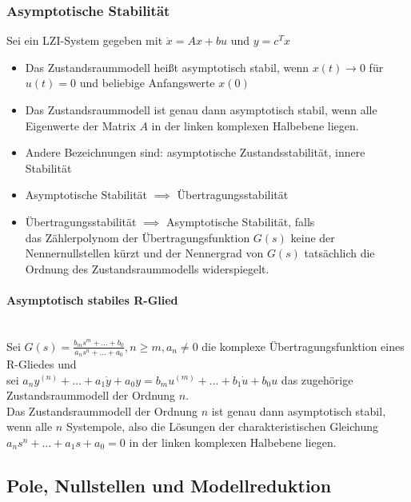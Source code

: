 \documentclass[10pt,a4paper]{article}
\begin{document}
\subsubsection{Asymptotische Stabilität}
Sei ein LZI-System gegeben mit $\dot x = Ax + bu$ und $y = c^T x$
\begin{itemize}
	\item Das Zustandsraummodell heißt asymptotisch stabil, wenn $x(t) → 0$ für $u(t) = 0$ und beliebige Anfangswerte $x(0)$
	\item Das Zustandsraummodell ist genau dann asymptotisch stabil, wenn alle Eigenwerte der Matrix $A$ in der linken komplexen Halbebene liegen.
	\item Andere Bezeichnungen sind: asymptotische Zustandsstabilität, innere Stabilität
	\item Asymptotische Stabilität $\implies$ Übertragungsstabilität
	\item Übertragungsstabilität $\implies$ Asymptotische Stabilität, falls \\ das Zählerpolynom der Übertragungsfunktion $G(s)$ keine der Nennernullstellen kürzt und der Nennergrad von $G(s)$ tatsächlich die Ordnung des Zustandsraummodells widerspiegelt.
\end{itemize}

\paragraph{Asymptotisch stabiles R-Glied} ~\\
Sei $G(s) = \frac{b_m s^m + \dots + b_0}{a_n s^n + \dots + a_0}, n ≥ m, a_n ≠ 0$ die komplexe Übertragungsfunktion eines R-Gliedes und \\
sei $a_n y^{(n)} + \dots + a_1 \dot y + a_0 y = b_m u^{(m)} + \dots + b_1 \dot u + b_0 u$ das zugehörige Zustandsraummodell der Ordnung $n$. \\
Das Zustandsraummodell der Ordnung $n$ ist genau dann asymptotisch stabil, wenn alle $n$ Systempole, also die Lösungen der charakteristischen Gleichung $a_n s^n + \dots + a_1 s + a_0 = 0$ in der linken komplexen Halbebene liegen.

\subsection{Pole, Nullstellen und Modellreduktion}
\end{document}
